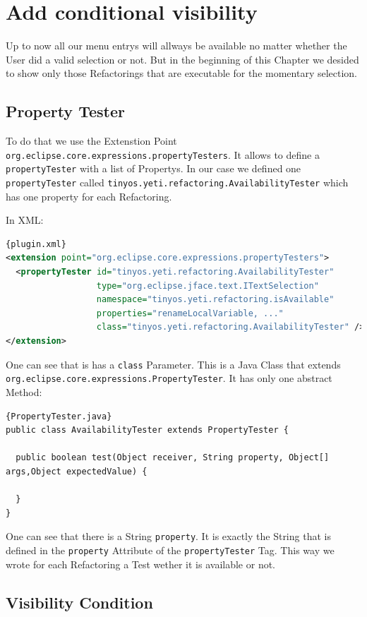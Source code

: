 \documentclass[a4paper,10pt]{report}
\begin{document}
\section{Add conditional visibility}
Up to now all our menu entrys will allways be available no matter whether the User did a valid selection or not. But in the beginning of this Chapter we desided to show only 
those Refactorings that are executable for the momentary selection.
\subsection{Property Tester}
To do that we use the Extenstion Point \verb!org.eclipse.core.expressions.propertyTesters!. It allows to define a \verb!propertyTester! with a list of Propertys. In our
case we defined one \verb!propertyTester! called \verb!tinyos.yeti.refactoring.AvailabilityTester! which has one property for each Refactoring.

In XML:
\begin{lstlisting}[language=XML,caption=Property Tester ({\it plugin.xml})]{plugin.xml}
<extension point="org.eclipse.core.expressions.propertyTesters">
  <propertyTester id="tinyos.yeti.refactoring.AvailabilityTester"
                  type="org.eclipse.jface.text.ITextSelection"
                  namespace="tinyos.yeti.refactoring.isAvailable"
                  properties="renameLocalVariable, ..."
                  class="tinyos.yeti.refactoring.AvailabilityTester" />
</extension>
\end{lstlisting}

One can see that is has a \verb!class! Parameter. This is a Java Class that extends \verb!org.eclipse.core.expressions.PropertyTester!. It has only one abstract Method:
\begin{lstlisting}[caption=extends PropertyTester]{PropertyTester.java}
public class AvailabilityTester extends PropertyTester {

  public boolean test(Object receiver, String property, Object[] args,Object expectedValue) {
    
  }
}
\end{lstlisting}
One can see that there is a String \verb!property!. It is exactly the String that is defined in the \verb!property! Attribute of the \verb!propertyTester! Tag.
This way we wrote for each Refactoring a Test wether it is available or not.

\subsection{Visibility Condition}
\end{document}
